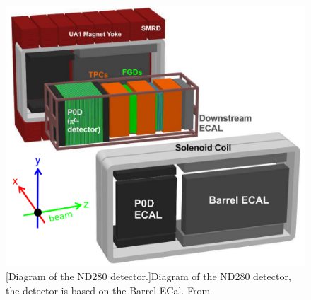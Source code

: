 \begin{figure}[!h]
 \centering
 \includegraphics[width=\linewidth/2]{Chapter2/Figs/Raster/ND280Fig.png} 
 [Diagram of the ND280 detector.]{Diagram of the ND280 detector, the detector is based on the Barrel ECal. From \cite{Allan_2013}} %
 \label{fig:nd280Fig}
\end{figure}

